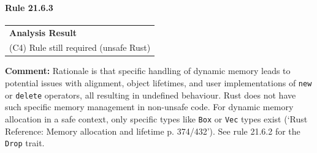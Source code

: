 \paragraph{Rule 21.6.3}
\begin{longtable}{p{13cm}}
\textbf{Analysis Result} \\
(C4) Rule still required (unsafe Rust) \\
\end{longtable}
\textbf{Comment:} Rationale is that specific handling of dynamic memory leads to potential issues with alignment, object lifetimes, and user implementations of \texttt{new} or \texttt{delete} operators, all resulting in undefined behaviour. Rust does not have such specific memory management in non-unsafe code. For dynamic memory allocation in a safe context, only specific types like \texttt{Box} or \texttt{Vec} types exist (`Rust Reference: Memory allocation and lifetime p. 374/432'). See rule 21.6.2 for the \texttt{Drop} trait. \\
